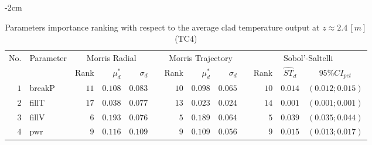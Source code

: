 \begin{table*}[!htbp]\centering
{}
\begin{adjustwidth*}{}{-2cm}
\caption{Parameters importance ranking with respect to the average clad temperature output at $z \approx 2.4 \, [m]$ (TC$4$)}
\label{tab:app_screening_tc4_average}
\begin{tabular}{@{}rlrrrrrrrrrcc@{}}\toprule
\multirow{2}{*}{\footnotesize{No.}} & \multirow{2}{*}{\footnotesize{Parameter}} & \multicolumn{3}{c}{\footnotesize{Morris Radial}} & \phantom{a} & \multicolumn{3}{c}{\footnotesize{Morris Trajectory}}  &\phantom{a}& \multicolumn{3}{c}{\footnotesize{Sobol'-Saltelli}}                               \\             
                                                                                  \cmidrule{3-5}                                                   \cmidrule{7-9}                                                      \cmidrule{11-13}
                                    &                                           & \footnotesize{Rank}   & $\mu^*_d$ & $\sigma_d$   &             & \footnotesize{Rank} & $\mu^*_d$ & $\sigma_d$          &           & \footnotesize{Rank} & \footnotesize{$\hat{ST}_d$} & \footnotesize{$95\%CI_{pct}$}\\ \midrule
\footnotesize{$1 $} & \footnotesize{breakP   } & \footnotesize{$11$} & \footnotesize{$0.108$} & \footnotesize{$0.083$} && \footnotesize{$10$} & \footnotesize{$0.098$} & \footnotesize{$0.065$} && \footnotesize{$10$} & \footnotesize{$0.014$} & \footnotesize{$(0.012;0.015)$} \\
\footnotesize{$2 $} & \footnotesize{fillT    } & \footnotesize{$17$} & \footnotesize{$0.038$} & \footnotesize{$0.077$} && \footnotesize{$13$} & \footnotesize{$0.023$} & \footnotesize{$0.024$} && \footnotesize{$14$} & \footnotesize{$0.001$} & \footnotesize{$(0.001;0.001)$} \\
\footnotesize{$3 $} & \footnotesize{fillV    } & \footnotesize{$6 $} & \footnotesize{$0.193$} & \footnotesize{$0.076$} && \footnotesize{$5 $} & \footnotesize{$0.189$} & \footnotesize{$0.064$} && \footnotesize{$5 $} & \footnotesize{$0.039$} & \footnotesize{$(0.035;0.044)$} \\
\footnotesize{$4 $} & \footnotesize{pwr      } & \footnotesize{$9 $} & \footnotesize{$0.116$} & \footnotesize{$0.109$} && \footnotesize{$9 $} & \footnotesize{$0.109$} & \footnotesize{$0.056$} && \footnotesize{$9 $} & \footnotesize{$0.015$} & \footnotesize{$(0.013;0.017)$} \\

\end{tabular}
\end{adjustwidth*}
\end{table*}
